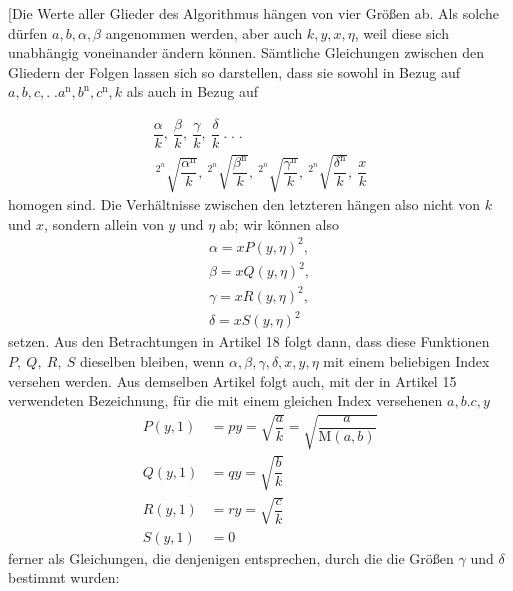[Die Werte aller Glieder des Algorithmus hängen von vier Größen ab. Als solche dürfen $a,\allowbreak b,\allowbreak \alpha,\allowbreak \beta$ angenommen werden, aber auch $k,\allowbreak y,\allowbreak x,\allowbreak \eta$, weil diese sich unabhängig voneinander ändern können. Sämtliche Gleichungen zwischen den Gliedern der Folgen lassen sich so darstellen, dass sie sowohl in Bezug auf $a,\allowbreak b,\allowbreak c,\allowbreak .\;. a^{\mathrm n},\allowbreak b^{\mathrm n},\allowbreak c^{\mathrm n},\allowbreak k$ als auch in Bezug auf



\[
\begin{gathered}\dfrac{\alpha}{k},\ \dfrac{\beta}{k},\ \dfrac{\gamma}{k},\ \dfrac{\delta}{k}\ .\;.\;.\\[8pt]\
{}^{2^n}\!\surd {\dfrac{\alpha^{\mathrm n}}{k}},\
{}^{2^n}\!\surd {\dfrac{\beta^{\mathrm n}}{k}},\
{}^{2^n}\!\surd {\dfrac{\gamma^{\mathrm n}}{k}},\
{}^{2^n}\!\surd {\dfrac{\delta^{\mathrm n}}{k}},\ \dfrac{x}{k}\end{gathered}
\]
homogen sind. Die Verhältnisse zwischen den letzteren hängen also nicht von $k$ und $x$, sondern allein von $y$ und $\eta$ ab; wir können also
\Needspace{14\baselineskip}
\[
\begin{gathered}\alpha=x P(y,\eta)^2,\\[5pt]
\beta=x Q(y,\eta)^2,\\[5pt]
\gamma=x R(y,\eta)^2,\\[5pt]
\delta=x S(y,\eta)^2\end{gathered}
\]
setzen. Aus den Betrachtungen in Artikel 18 folgt dann, dass diese Funktionen $P,\allowbreak \ Q,\allowbreak \ R,\allowbreak \ S$ dieselben bleiben, wenn $\alpha,\allowbreak \beta,\allowbreak \gamma,\allowbreak \delta,\allowbreak x,\allowbreak y,\allowbreak \eta$ mit einem beliebigen Index versehen werden. 
Aus demselben Artikel folgt auch, mit der in Artikel 15 verwendeten Bezeichnung, für die mit einem gleichen Index versehenen $a,\allowbreak b. c,\allowbreak y$
\[
\begin{aligned}
P(y,1)&=py=\surd {\dfrac ak}=\surd {\dfrac a{\mathrm M(a,b)}}\\
Q(y,1)&=qy=\surd {\dfrac bk}\\
R(y,1)&=ry=\surd {\dfrac ck}\\
S(y,1)&=0
\end{aligned}
\]
ferner als Gleichungen, die denjenigen entsprechen, durch die die Größen $\gamma$ und $\delta$ bestimmt wurden:
